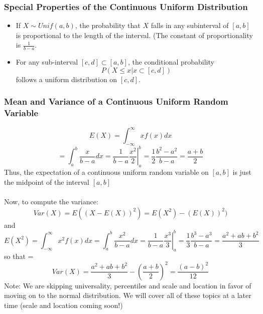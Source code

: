 \documentclass[12pt]{article} %
\begin{document}
\subsubsection{Special Properties of the Continuous Uniform Distribution}
\begin{itemize}
\item If $X\sim Unif(a,b)$, the probability that $X$ falls in any subinterval of $[a,b]$ is proportional to the length of the interval. (The constant of proportionality is $\frac{1}{b-a}$.  
\item For any sub-interval $[c,d]\subset [a,b]$, the conditional probability
$$P(X\leq x| x\subset [c,d])$$
follows a uniform distribution on $[c,d]$.
\end{itemize}
\subsubsection{Mean and Variance of a Continuous Uniform Random Variable}
$$E(X) = \int_{-\infty}^{\infty}xf(x) dx$$
$$= \int_a^b \frac{x}{b-a}dx = \frac{1}{b-a} \left.\frac{x^2}2 \right\rvert_a^b = 
\frac12 \frac{b^2-a^2}{b-a} = \frac{a+b}2$$
Thus, the expectation of a continuous uniform random variable on $[a,b]$ is just the midpoint of the interval $[a,b]$\\\\
Now, to compute the variance:
$$Var(X) = E((X-E(X))^2) = E(X^2) - \left(E(X)\right)^2)$$
and
$$E(X^2) = \int_{-\infty}^{\infty} x^2 f(x) dx = \int_a^b \frac{x^2}{b-a} dx = \frac1{b-a} \left.\frac{x^3}3\right\rvert_a^b = \frac13 \frac{b^3-a^3}{b-a} = \frac{a^2+ab+b^2}{3}$$ 
so that = 
$$Var(X) = \frac{a^2+ab+b^2}{3} - \left(\frac{a+b}2\right)^2 = \frac{\left(a-b\right)^2}{12}$$
Note: We are skipping universality, percentiles and scale and location in favor of moving on to the normal distribution. We will cover all of these topics at a later time (scale and location coming soon!)
\end{document}
